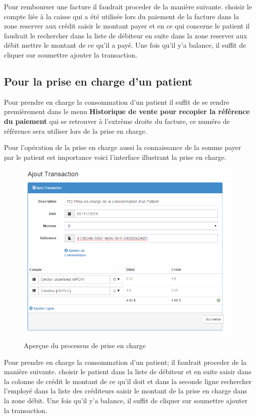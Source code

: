 \documentclass[12pt,a4paper]{report}
\begin{document}
Pour rembourser une facture il faudrait proceder de la manière suivante. choisir le compte liée à la caisse qui a été utilisée lors du paiement de la facture dans la zone reserver aux crédit saisir le montant payer et en ce qui concerne le patient il faudrait le rechercher dans la liste de débiteur en suite dans la zone reserver aux débit mettre le montant de ce qu'il a payé.
Une fois qu'il y'a balance, il suffit de cliquer sur soumettre ajouter la transaction.
\newpage
\subsection{Pour la prise en charge d'un patient}
Pour prendre en charge la consommation d'un patient il suffit de se rendre premièrement dans le menu \textbf{Historique de vente pour recopier la référence du paiement} qui se retrouver à l'extrème droite du facture, ce numéro de référence sera utiliser lors de la prise en charge.

Pour l'opération de la prise en charge aussi la connaissance de la somme payer par le patient est importance voici l'interface illustrant la prise en charge.

\begin{figure}[h]
\begin{center}
\includegraphics[width=12cm]{pic/ATPriseEnCharge.png}
\end{center}
\caption{Aperçue du processus de prise en charge}
\label{Aperçue du processus de prise en charge}
\end{figure}

Pour prendre en charge la consommation d'un patient; il faudrait proceder de la manière suivante. choisir le patient dans la liste de débiteur et en suite saisir dans la colonne de crédit le montant de ce qu'il doit et dans la seconde ligne rechercher l'employé dans la liste des créditeurs saisir le montant de la prise en charge dans la zone débit.
Une fois qu'il y'a balance, il suffit de cliquer sur soumettre ajouter la transaction.
\end{document}
